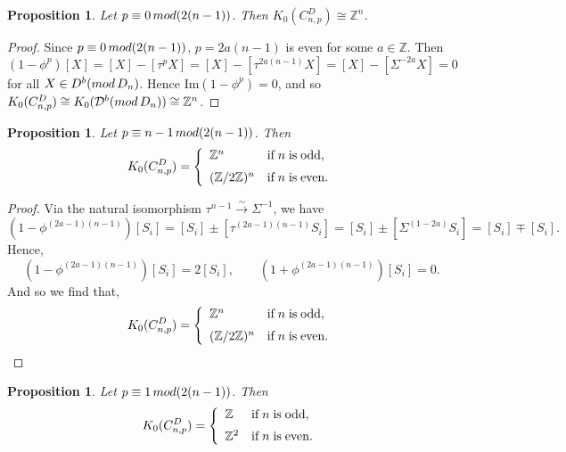 \documentclass[a4paper,reqno,11pt]{amsart}
\newtheorem{proposition}[theorem]{Proposition}
\theoremstyle{definition}
\def\D{\mathcal{D}}
\def \text{\mbox}
\renewcommand{\mod}{\mathop{\rm mod}\nolimits}%
\begin{document}
\begin{proposition}\label{DLem: p equiv 0}
	Let $p \equiv 0 \mod (2(n-1))$.
	Then $K_0(C_{n,p}^D) \cong \mathbb{Z}^n$.
\end{proposition}

\begin{proof}
	Since $p \equiv 0 \mod (2(n-1))$,  $p =2a(n-1)$ is even for some $a \in \mathbb{Z}$.
	Then
$$(1 - \phi^p) [X] = [X] - [\tau^p X] = [X] - [\tau^{2a(n-1)} X]
= [X] - [\Sigma^{-2a} X] =0$$ for all $X \in D^b(\mod {D_n})$.
	Hence $\mathrm{Im}(1 - \phi^p) =0$, and so $K_0(C_{n,p}^D) \cong K_0(\D^b(\mod {D_n})) \cong \mathbb{Z}^n$.
\end{proof}







\begin{proposition}
	Let $p \equiv n-1 \mod (2(n-1))$.
	Then
	\[ K_0(C_{n,p}^D) =\left\{
	\begin{array}{ll}
		\mathbb{Z}^n & \text{if\;$n$\;is\;odd},\\[2mm]
		(\mathbb{Z}/2\mathbb{Z})^n & \text{if\;$n$\;is\;even}.
	\end{array}
	\right.
	\]	
\end{proposition}

\begin{proof}
	Via the natural isomorphism $\tau^{n-1} \xrightarrow{\sim} \Sigma^{-1}$, we have
	\[
	(1 - \phi^{(2a-1)(n-1)})[S_i] = [S_i] \pm [\tau^{(2a-1)(n-1)}S_i] = [S_i] \pm [\Sigma^{(1-2a)}S_i] = [S_i] \mp [S_i].
	\]
	Hence,
	\[
	(1 - \phi^{(2a-1)(n-1)})[S_i] = 2[S_i], \qquad (1 + \phi^{(2a-1)(n-1)})[S_i] = 0.
	\]
	And so we find that,
	\[ K_0(C_{n,p}^D) =\left\{
	\begin{array}{ll}
		\mathbb{Z}^n & \text{if\;$n$\;is\;odd},\\[2mm]
		(\mathbb{Z}/2\mathbb{Z})^n & \text{if\;$n$\;is\;even}.
	\end{array}
	\right.
	\]	
\end{proof}








\begin{proposition}\label{DLem: p equiv 1}
	Let  $p \equiv 1 \mod (2(n-1))$. Then
\[ K_0(C_{n,p}^D) =\left\{
\begin{array}{ll}
\mathbb{Z} & \text{if\;$n$\;is\;odd},\\[2mm]
		\mathbb{Z}^2 & \text{if\;$n$\;is\;even}.
\end{array}
\right.
\]	
\end{proposition}
\end{document}
